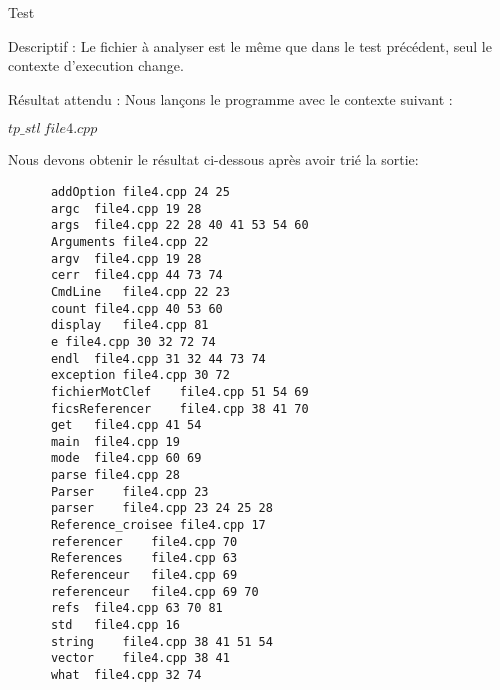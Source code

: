\documentclass{article}
\begin{document}
  \newpage

  \begin{subsection}{Test }
    \begin{paragraph}{Descriptif :}
      Le fichier à analyser est le même que dans le test précédent, seul le contexte d'execution change.
    \end{paragraph}
    
\begin{paragraph}{Résultat attendu :}
       Nous lançons le programme avec le contexte suivant :  
       \begin{center}
	\textbf{$tp\_stl\ file4.cpp$}
      \end{center}
      
      Nous devons obtenir le résultat ci-dessous après avoir trié la sortie: 
      \begin{listing}[h!]
      \begin{verbatim}
	  addOption	file4.cpp 24 25	
	  argc	file4.cpp 19 28	
	  args	file4.cpp 22 28 40 41 53 54 60	
	  Arguments	file4.cpp 22	
	  argv	file4.cpp 19 28	
	  cerr	file4.cpp 44 73 74	
	  CmdLine	file4.cpp 22 23	
	  count	file4.cpp 40 53 60	
	  display	file4.cpp 81	
	  e	file4.cpp 30 32 72 74	
	  endl	file4.cpp 31 32 44 73 74	
	  exception	file4.cpp 30 72	
	  fichierMotClef	file4.cpp 51 54 69	
	  ficsReferencer	file4.cpp 38 41 70	
	  get	file4.cpp 41 54	
	  main	file4.cpp 19	
	  mode	file4.cpp 60 69	
	  parse	file4.cpp 28	
	  Parser	file4.cpp 23	
	  parser	file4.cpp 23 24 25 28	
	  Reference_croisee	file4.cpp 17	
	  referencer	file4.cpp 70	
	  References	file4.cpp 63	
	  Referenceur	file4.cpp 69	
	  referenceur	file4.cpp 69 70	
	  refs	file4.cpp 63 70 81	
	  std	file4.cpp 16	
	  string	file4.cpp 38 41 51 54	
	  vector	file4.cpp 38 41	
	  what	file4.cpp 32 74	
      \end{verbatim}
  
      \end{listing}
    \end{paragraph}
  \end{subsection}
\end{document}
